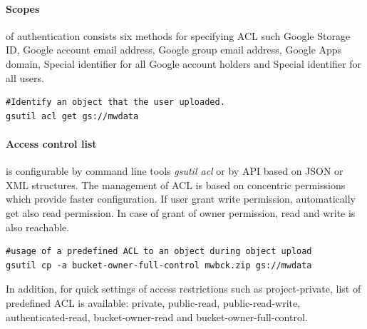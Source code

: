 \documentclass[a4paper,12pt,oneside]{report}
\begin{document}
	\paragraph{Scopes}\label{par:scopes} of authentication consists six methods for 
	specifying ACL such  Google Storage ID, Google account email address, Google 
	group email address, Google Apps domain, Special identifier for all Google 
	account holders and Special identifier for all users.
	
	\begin{footnotesize}
		\begin{lstlisting}[style=mybash]
#Identify an object that the user uploaded.
gsutil acl get gs://mwdata
		\end{lstlisting}\end{footnotesize}
	
	
	\paragraph{Access control list}\label{acl} is configurable by command line tools
	\textit{gsutil acl} or by API based on JSON or XML structures. The management of ACL is based on concentric permissions which provide faster configuration. If user grant 
	write permission, automatically get also read permission. In case of grant of owner 
	permission, read and write is also reachable.\begin{footnotesize}
		\begin{lstlisting}[style=mybash]
#usage of a predefined ACL to an object during object upload
gsutil cp -a bucket-owner-full-control mwbck.zip gs://mwdata
		\end{lstlisting}
	\end{footnotesize}
	In addition, for quick settings of access
	restrictions such as project-private, list of predefined ACL is available:
	private, public-read, public-read-write, authenticated-read, 
	bucket-owner-read and bucket-owner-full-control.
	
	
	
	
	
\end{document}
